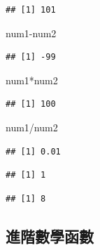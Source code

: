 \documentclass[]{book}
\newenvironment{Shaded}{\begin{snugshade}}{\end{snugshade}}
\newcommand{\DecValTok}[1]{\textcolor[rgb]{0.00,0.00,0.81}{{#1}}}
\newcommand{\NormalTok}[1]{{#1}}
\theoremstyle{definition}
\theoremstyle{definition}
\theoremstyle{remark}
\begin{document}
\begin{verbatim}
## [1] 101
\end{verbatim}

\begin{Shaded}
\begin{Highlighting}[]
\NormalTok{num1-num2}
\end{Highlighting}
\end{Shaded}

\begin{verbatim}
## [1] -99
\end{verbatim}

\begin{Shaded}
\begin{Highlighting}[]
\NormalTok{num1*num2}
\end{Highlighting}
\end{Shaded}

\begin{verbatim}
## [1] 100
\end{verbatim}

\begin{Shaded}
\begin{Highlighting}[]
\NormalTok{num1/num2}
\end{Highlighting}
\end{Shaded}

\begin{verbatim}
## [1] 0.01
\end{verbatim}

\begin{Shaded}
\end{Shaded}

\begin{verbatim}
## [1] 1
\end{verbatim}

\begin{Shaded}
\end{Shaded}

\begin{verbatim}
## [1] 8
\end{verbatim}

\subsection{進階數學函數}
\end{document}
